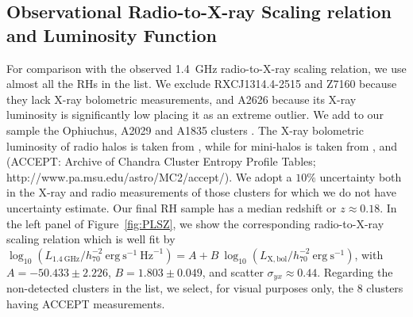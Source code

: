 \documentclass[traditabstract]{aa}
\newcommand{\rmn}{\mathrm}
\begin{document}
\begin{appendix}

\section{Observational Radio-to-X-ray Scaling relation and Luminosity Function}
\label{app:D}

For comparison with the observed 1.4~GHz radio-to-X-ray scaling relation, we use almost all the RHs in the \cite{2011A&A...527A..99E} list. We exclude RXCJ1314.4-2515 and Z7160 because they lack X-ray bolometric measurements, and A2626 because its X-ray luminosity is significantly low placing it as an extreme outlier. We add to our sample the Ophiuchus, A2029 and A1835 clusters \citep{2009A&A...499..371G}. The X-ray bolometric luminosity of radio halos is taken from \cite{2009A&A...507..661B}, while for mini-halos is taken from \cite{2002ApJ...567..716R}, \cite{Boehringer:1998vv} and \cite{2009ApJS..182...12C} (ACCEPT: Archive of Chandra Cluster Entropy Profile Tables; http://www.pa.msu.edu/astro/MC2/accept/). We adopt a $10\%$ uncertainty both in the X-ray and radio measurements of those clusters for which we do not have uncertainty estimate. Our final RH sample has a median redshift or $z\approx0.18$. In the left panel of Figure~\ref{fig:PLSZ}, we show the corresponding radio-to-X-ray scaling relation which is well fit by $\log_{10} (L_{1.4~\rmn{GHz}}/h_{70}^{-2}~\rmn{erg}~\rmn{s}^{-1}~\rmn{Hz}^{-1}) = A + B~\log_{10} (L_{ \rmn{X,bol}}/h_{70}^{-2}~\rmn{erg}~\rmn{s}^{-1})$, with $A=-50.433\pm2.226$, $B=1.803\pm0.049$, and scatter $\sigma_{yx} \approx 0.44$. Regarding the non-detected clusters in the \cite{2011A&A...527A..99E} list, we select, for visual purposes only, the 8 clusters having ACCEPT measurements. 


\end{appendix}
\end{document}
